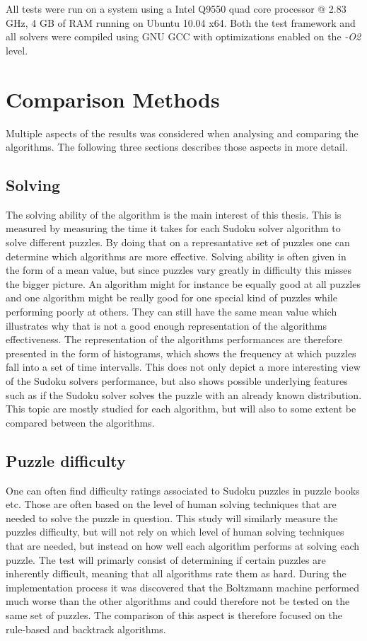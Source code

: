 \documentclass[a4paper,11pt]{kth-mag}
\begin{document}
All tests were run on a system using a Intel Q9550 quad core processor @ 2.83 GHz, 4 GB of RAM running on Ubuntu 10.04 x64.
Both the test framework and all solvers were compiled using GNU GCC with optimizations enabled on the \emph{-O2} level.

\FloatBarrier
\section{Comparison Methods}
\label{sec:comparisonMethod}
Multiple aspects of the results was considered when analysing and comparing the algorithms. The following three sections describes those aspects in more detail. 

\FloatBarrier
\subsection{Solving}
The solving ability of the algorithm is the main interest of this thesis.
This is measured by measuring the time it takes for each Sudoku solver algorithm to solve different puzzles.
By doing that on a represantative set of puzzles one can determine which algorithms are more effective.
Solving ability is often given in the form of a mean value, but since puzzles vary greatly in difficulty this misses the bigger picture.
An algorithm might for instance be equally good at all puzzles and one algorithm might be really good for one special kind of puzzles while performing poorly at others.
They can still have the same mean value which illustrates why that is not a good enough representation of the algorithms effectiveness.
The representation of the algorithms performances are therefore presented in the form of histograms, which shows the frequency at which puzzles fall into a set of time intervalls.
This does not only depict a more interesting view of the Sudoku solvers performance, but also shows possible underlying features such as if the Sudoku solver solves the puzzle with an already known distribution.
This topic are mostly studied for each algorithm, but will also to some extent be compared between the algorithms.

\FloatBarrier
\subsection{Puzzle difficulty}
\label{sec:puzzleDifficulty}
One can often find difficulty ratings associated to Sudoku puzzles in puzzle books etc. 
Those are often based on the level of human solving techniques that are needed to solve the puzzle in question.\cite{difficulty} 
This study will similarly measure the puzzles difficulty, but will not rely on which level of human solving techniques that are needed, but instead on how well each algorithm performs at solving each puzzle. 
The test will primarly consist of determining if certain puzzles are inherently difficult, meaning that all algorithms rate them as hard.
During the implementation process it was discovered that the Boltzmann machine performed much worse than the other algorithms and could therefore not be tested on the same set of puzzles.
The comparison of this aspect is therefore focused on the rule-based and backtrack algorithms.
\end{document}
